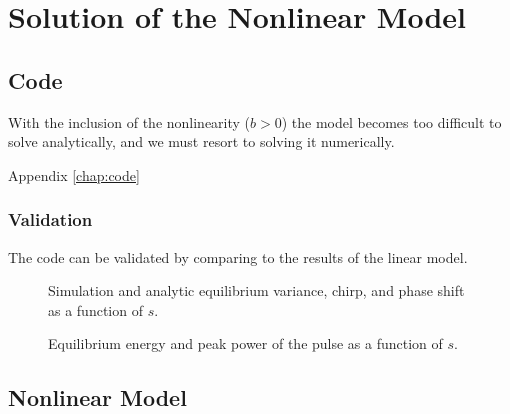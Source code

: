
\chapter{Solution of the Nonlinear Model}
\section{Code}
With the inclusion of the nonlinearity ($b > 0$) the model becomes too difficult to solve analytically, and we must resort to solving it numerically. 

Appendix \ref{chap:code}

\subsection{Validation}
The code can be validated by comparing to the results of the linear model.

\begin{figure}[htbp]
\centering

\caption{Simulation and analytic equilibrium variance, chirp, and phase shift as a function of $s$.}
\label{fig:}
\end{figure}



\begin{figure}[htbp]
\centering

\caption{Equilibrium energy and peak power of the pulse as a function of $s$.}
\label{fig:}
\end{figure}

\section{Nonlinear Model}


\begin{figure}[htbp]
\centering

\caption{}
\label{fig:}
\end{figure}

\begin{figure}[htbp]
\centering

\caption{}
\label{fig:}
\end{figure}

\begin{figure}[htbp]
\centering

\caption{}
\label{fig:}
\end{figure}

\begin{figure}[htbp]
\centering

\caption{}
\label{fig:}
\end{figure}

